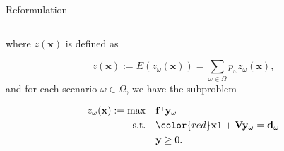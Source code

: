 \begin{frame}{Reformulation}
\begin{columns}
\begin{column}{0.49\textwidth}
      where $z(\mathbf{x})$ is defined as 

    $$z(\mathbf{x}) := E(z_{\omega}(\mathbf{x})) = \sum_{\omega \in \Omega} p_{\omega} z_{\omega}(\mathbf{x}),$$ and for each scenario $\omega \in \Omega$, we have the subproblem

\begin{equation}\label{BD_sub}
  \begin{aligned}
    z_{\omega}(\mathbf{x}) := \max \quad & \mathbf{f}^{\intercal} \mathbf{y}_{\omega} \\
    \text {s.t.} \quad & {\color{red}\mathbf{x} \mathbf{1} + \mathbf{V} \mathbf{y}_{\omega} = \mathbf{d}_{\omega}} \\
     & \mathbf{y} \geq 0.
  \end{aligned}
  \end{equation}
    \end{column}
\end{columns}
\end{frame}





